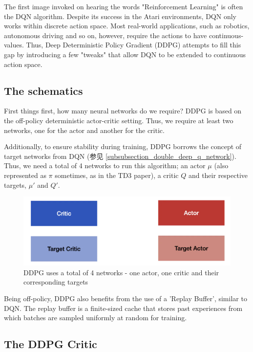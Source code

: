 The first image invoked on hearing the words "Reinforcement Learning" is often 
the DQN algorithm. Despite its success in the Atari environments, DQN only works 
within discrete action space. Most real-world applications, such as robotics, 
autonomous driving and so on, however, require the actions to have continuous-values. 
Thus, Deep Deterministic Policy Gradient (DDPG) attempts to fill this gap by 
introducing a few "tweaks" that allow DQN to be extended to continuous action space.


\subsection{The schematics}

First things first, how many neural networks do we require? DDPG is based on 
the off-policy deterministic actor-critic setting. Thus, we require at least two 
networks, one for the actor and another for the critic.

Additionally, to ensure stability during training, DDPG borrows the concept of 
target networks from DQN (参见 \ref{subsubsection_double_deep_q_network}). Thus, 
we need a total of 4 networks to run this algorithm; 
an actor $\mu$ (also represented as $\pi$ sometimes, as in the TD3 paper), a critic 
$Q$ and their respective targets, $\mu'$ and $Q'$.

\begin{figure}[h]
\centering
\includegraphics[scale=0.5]{pix/td3/ddpg_schematics.png}
\caption{DDPG uses a total of 4 networks - one actor, one critic and their 
corresponding targets}
\end{figure}

Being off-policy, DDPG also benefits from the use of a 'Replay Buffer', similar 
to DQN. The replay buffer is a finite-sized cache that stores past experiences 
from which batches are sampled uniformly at random for training.

\subsection{The DDPG Critic}

